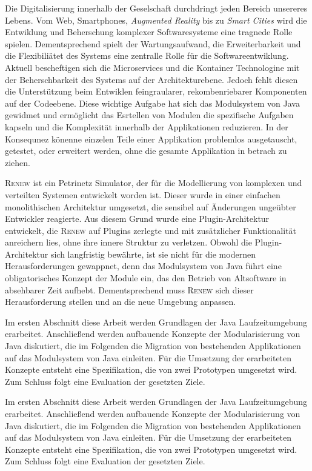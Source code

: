 Die Digitalisierung innerhalb der Geselschaft durchdringt jeden Bereich unsereres Lebens. Vom Web, Smartphones, \textit{Augmented Reality} bis zu \textit{Smart Cities} wird die Entwiklung und Beherschung komplexer Softwaresysteme eine tragnede Rolle spielen. Dementsprechend spielt der Wartungsaufwand, die Erweiterbarkeit und die Flexibiliätet des Systems eine zentralle Rolle für die Softwareentwiklung. Aktuell bescheftigen sich die Microservices und die Kontainer Technologine mit der Beherschbarkeit des Systems auf der Architekturebene. Jedoch fehlt diesen die Unterstützung beim Entwiklen feingraularer, rekombenriebarer Komponenten auf der Codeebene. Diese wichtige Aufgabe hat sich das Modulsystem von Java gewidmet und ermöglicht das Esrtellen von Modulen die spezifische Aufgaben kapseln und die Komplexität innerhalb der Applikationen reduzieren. In der Konsequnez könenne einzelen Teile einer Applikation problemlos ausgetauscht, getestet, oder erweitert werden, ohne die gesamte Applikation in betrach zu ziehen.\bigbreak

\textsc{Renew} ist ein Petrinetz Simulator, der für die Modellierung von komplexen und verteilten Systemen entwickelt worden ist. Dieser wurde in einer einfachen monolithischen Architektur umgesetzt, die sensibel auf Änderungen ungeübter Entwickler reagierte. Aus diesem Grund wurde eine Plugin-Architektur entwickelt, die \textsc{Renew} auf Plugins zerlegte und mit zusätzlicher Funktionalität anreichern lies, ohne ihre innere Struktur zu verletzen. \bigbreak
Obwohl die Plugin-Architektur sich langfristig bewährte, ist sie nicht für die modernen Herausforderungen gewappnet, denn das Modulsystem von Java führt eine obligatorisches Konzept der Module ein, das den Betrieb von Altsoftware 
in absehbarer Zeit aufhebt. Dementsprechend muss \textsc{Renew} sich dieser Herausforderung stellen und an die neue Umgebung anpassen. \newline

Im ersten Abschnitt diese Arbeit werden Grundlagen der Java Laufzeitumgebung erarbeitet. Anschließend werden aufbauende Konzepte der Modularisierung von Java diskutiert, die im Folgenden die Migration von bestehenden Applikationen auf das Modulsystem von Java einleiten. Für die Umsetzung der erarbeiteten Konzepte entsteht eine Spezifikation, die von zwei Prototypen umgesetzt wird. Zum Schluss folgt eine Evaluation der gesetzten Ziele.


Im ersten Abschnitt diese Arbeit werden Grundlagen der Java Laufzeitumgebung erarbeitet. Anschließend werden aufbauende Konzepte der Modularisierung von Java diskutiert, die im Folgenden die Migration von bestehenden Applikationen auf das Modulsystem von Java einleiten. Für die Umsetzung der erarbeiteten Konzepte entsteht eine Spezifikation, die von zwei Prototypen umgesetzt wird. Zum Schluss folgt eine Evaluation der gesetzten Ziele.


